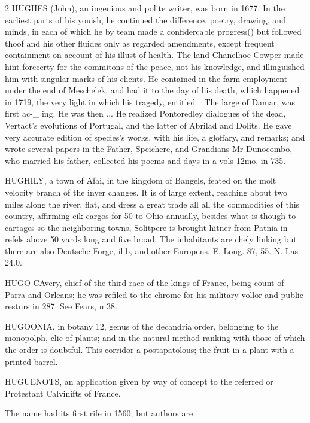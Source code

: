 \documentclass[10pt]{article}
\begin{document}
\begin{multicols}{2}
HUGHES (John), an ingenious and polite writer, was born in 1677. In the earliest parts of his youish, he continued the difference, poetry, drawing, and minds, in each of which he by team made a confidercable progress() but followed thoof and his other fluides only as regarded amendments, except frequent containment on account of his illust of health. The land Chanelhoe Cowper made hint forecerty for the commitons of the peace, not his knowledge, and illinguished him with singular marks of his clients. He contained in the farm employment under the end of Meschelek, and had it to the day of his death, which happened in 1719, the very light in which his tragedy, entitled \_The large of Damar, was first ac-\_ ing. He was then ... He realized Pontoredley dialogues of the dead, Vertact's evolutions of Portugal, and the latter of Abrilad and Dolits. He gave very accurate edition of species's works, with his life, a gloffary, and remarks; and wrote several papers in the Father, Speichere, and Grandians Mr Dunocombo, who married his father, collected his poems and days in a vols 12mo, in 735.

HUGHILY, a town of Afai, in the kingdom of Bangels, feated on the molt velocity branch of the inver changes. It is of large extent, reaching about two miles along the river, flat, and dress a great trade all all the commodities of this country, affirming cik cargos for 50 to Ohio annually, besides what is though to cartages so the neighboring towns, Solitpere is brought hitner from Patnia in refels above 50 yards long and five broad. The inhabitants are chely linking but there are also Deutsche Forge, ilib, and other Europens. E. Long. 87, 55. N. Las 24.0.

HUGO CAvery, chief of the third race of the kings of France, being count of Parra and Orleans; he was refiled to the chrome for his military vollor and public resturs in 287. See Fears, n 38.

HUGOONIA, in botany 12, genus of the decandria order, belonging to the monopolph, clic of plants; and in the natural method ranking with those of which the order is doubtful. This corridor a postapatolous; the fruit in a plant with a printed barrel.

HUGUENOTS, an application given by way of concept to the referred or Protestant Calvinifts of France.

The name had its first rife in 1560; but authors are

\end{multicols}
\end{document}
